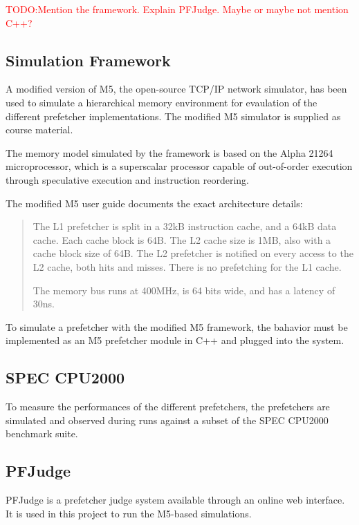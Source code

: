 \documentclass[a4paper]{IEEEtran}
\newcommand\TODO[1]{\textcolor{red}{TODO:#1}}
\newcommand\todo[1]{\TODO{#1}}
\begin{document}
\todo{Mention the framework. Explain PFJudge. Maybe or maybe not mention C++?}


\subsection{Simulation Framework}

A modified version of M5, the open-source TCP/IP network simulator\cite{M5paper}, has been used to simulate a hierarchical memory environment for evaulation of the different prefetcher implementations.
The modified M5 simulator is supplied as course material.

The memory model simulated by the framework is based on the Alpha 21264 microprocessor, which is a superscalar processor capable of out-of-order execution through speculative execution and instruction reordering.

The modified M5 user guide documents the exact architecture details:

\begin{quote}
The L1 prefetcher is split in a 32kB instruction cache, and a 64kB data cache.
Each cache block is 64B.
The L2 cache size is 1MB, also with a cache block size of 64B.
The L2 prefetcher is notified on every access to the L2 cache, both hits and misses.
There is no prefetching for the L1 cache.

The memory bus runs at 400MHz, is 64 bits wide, and has a latency of 30ns.~\cite{m5userguide}
\end{quote}

To simulate a prefetcher with the modified M5 framework, the bahavior must be implemented as an M5 prefetcher module in C++ and plugged into the system.

\subsection{SPEC CPU2000}

To measure the performances of the different prefetchers, the prefetchers are simulated and observed during runs against a subset of the SPEC CPU2000 benchmark suite.~\cite{http://dl.acm.org/citation.cfm?id=621510}

\subsection{PFJudge}

PFJudge is a prefetcher judge system available through an online web interface.
It is used in this project to run the M5-based simulations.
\end{document}
